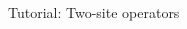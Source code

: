 \begin{frame}[fragile]{Tutorial: Two-site operators}
\begin{columns}
\begin{column}{5.5cm}
\end{column}

\end{columns}

\end{frame}

